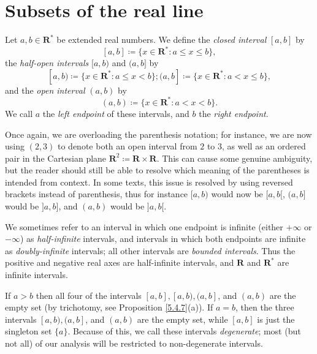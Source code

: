 \section{Subsets of the real line}\label{sec 9.1}

\begin{definition}[Intervals]\label{9.1.1}
    Let \(a, b \in \mathbf{R}^*\) be extended real numbers.
    We define the \emph{closed interval} \([a, b]\) by
    \[
        [a, b] \coloneqq \{x \in \mathbf{R}^* : a \leq x \leq b\},
    \]
    the \emph{half-open intervals} \([a, b)\) and \((a, b]\) by
    \[
        [a, b) \coloneqq \{x \in \mathbf{R}^* : a \leq x < b\}; (a, b] \coloneqq \{x \in \mathbf{R}^* : a < x \leq b\},
    \]
    and the \emph{open interval} \((a, b)\) by
    \[
        (a, b) \coloneqq \{x \in \mathbf{R}^* : a < x < b\}.
    \]
    We call \(a\) the \emph{left endpoint} of these intervals, and \(b\) the \emph{right endpoint}.
\end{definition}

\begin{remark}\label{9.1.2}
    Once again, we are overloading the parenthesis notation;
    for instance, we are now using \((2, 3)\) to denote both an open interval from \(2\) to \(3\), as well as an ordered pair in the Cartesian plane \(\mathbf{R}^2 \coloneqq \mathbf{R} \times \mathbf{R}\).
    This can cause some genuine ambiguity, but the reader should still be able to resolve which meaning of the parentheses is intended from context.
    In some texts, this issue is resolved by using reversed brackets instead of parenthesis, thus for instance \([a, b)\) would now be \([a, b[\), \((a, b]\) would be \(]a, b]\), and \((a, b)\) would be \(]a, b[\).
\end{remark}

\begin{note}
    We sometimes refer to an interval in which one endpoint is infinite (either \(+\infty\) or \(-\infty\)) as \emph{half-infinite} intervals, and intervals in which both endpoints are infinite as \emph{doubly-infinite} intervals;
    all other intervals are \emph{bounded intervals}.
    Thus the positive and negative real axes are half-infinite intervals, and \(\mathbf{R}\) and \(\mathbf{R}^*\) are infinite intervals.
\end{note}

\setcounter{theorem}{3}
\begin{example}\label{9.1.4}
    If \(a > b\) then all four of the intervals \([a, b], [a, b), (a, b]\), and \((a, b)\) are the empty set (by trichotomy, see Proposition \ref{5.4.7}(a)).
    If \(a = b\), then the three intervals \([a, b), (a, b]\), and \((a, b)\) are the empty set, while \([a, b]\) is just the singleton set \(\{a\}\).
    Because of this, we call these intervals \emph{degenerate};
    most (but not all) of our analysis will be restricted to non-degenerate intervals.
\end{example}

